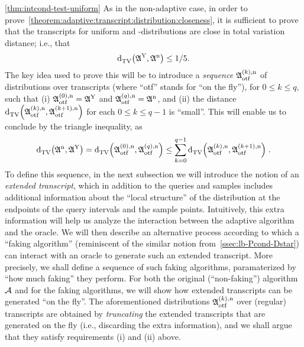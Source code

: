 \begin{proofof}{\cref{thm:intcond-test-uniform}}
As in the non-adaptive case, in order to prove~\cref{theorem:adaptive:transcript:distribution:closeness},
it is sufficient to prove that the transcripts for uniform and \no-distributions are close in
total variation distance; i.e., that
\begin{equation}\label{eqn:adaptive:transcript:distribution:closeness}
     {\operatorname{d}_{\textrm{TV}}^{}\!\left({ \mathfrak{A}^{\rm Y} ,  \mathfrak{A}^{\rm n}}\right)} \leq 1/5.
\end{equation}
The key idea used to prove this will be to introduce a \emph{sequence} $\mathfrak{A}^{(k), \rm n}_{\rm otf}$ of distributions over transcripts (where ``otf'' stands for ``on the fly''), for $0\leq k \leq q$, such that (i) $\mathfrak{A}^{(0), \rm n}_{\rm otf}=\mathfrak{A}^{\rm Y}$ and $\mathfrak{A}^{(q), \rm n}_{\rm otf}=\mathfrak{A}^{\rm n}$, and (ii) the distance ${\operatorname{d}_{\textrm{TV}}^{}\!\left({ \mathfrak{A}^{(k), \rm n}_{\rm otf} ,  \mathfrak{A}^{(k+1), \rm n}_{\rm otf} }\right)}$
for each $0 \leq k \leq q-1$
is ``small''. This will enable us to conclude by the triangle inequality, as
\begin{equation}
     {\operatorname{d}_{\textrm{TV}}^{}\!\left({ \mathfrak{A}^{\rm n} ,  \mathfrak{A}^{\rm Y} }\right)}
     = {\operatorname{d}_{\textrm{TV}}^{}\!\left({ \mathfrak{A}^{(0), \rm n}_{\rm otf} ,  \mathfrak{A}^{(q), \rm n}_{\rm otf} }\right)}
     \leq \sum_{k=0}^{q-1} {\operatorname{d}_{\textrm{TV}}^{}\!\left({ \mathfrak{A}^{(k), \rm n}_{\rm otf} ,  \mathfrak{A}^{(k+1), \rm n}_{\rm otf} }\right)}\;.
\label{eq:tvd:otf:sum}
\end{equation}
To define this sequence, in the next subsection we will introduce the notion of an \emph{extended transcript}, which in addition
to the queries and samples includes additional information about the ``local structure'' of the distribution
at the endpoints of the query intervals and the sample points. Intuitively, this extra information will help us analyze the
interaction between the adaptive algorithm and the oracle. We will then describe an alternative process according to which a
``faking algorithm'' (reminiscent of the similar notion from~\cref{ssec:lb-Pcond-Dstar}) can interact with an oracle to generate such an extended transcript. 
 More precisely, we shall define a sequence of such faking algorithms, paramaterized
 by ``how much faking'' they perform. For both the original (``non-faking'')
algorithm $\mathcal{A}$ and for the faking algorithms, we will show how extended transcripts can be generated
``on the fly''. The aforementioned distributions $\mathfrak{A}^{(k), \rm n}_{\rm otf}$
over (regular) transcripts are obtained by \emph{truncating} the extended transcripts
that are generated on the fly (i.e., discarding the extra information), and we shall
argue that they satisfy requirements (i) and (ii) above.


\end{proofof}
